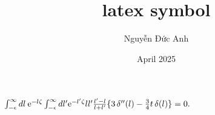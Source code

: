 \documentclass{article}
\title{latex symbol}
\author{Nguyễn Đức Anh}
\date{April 2025}
\begin{document}
$\int_{-\epsilon}^\infty dl\: {\rm e}^{-l\zeta}	\int_{-\epsilon}^\infty dl' {\rm e}^{-l'\zeta}	ll'{l'-l \over l+l'} \{3\,\delta''(l) - {3 \over 4}t\,\delta(l) \} =0.		\label{eq21}$
\end{document}
